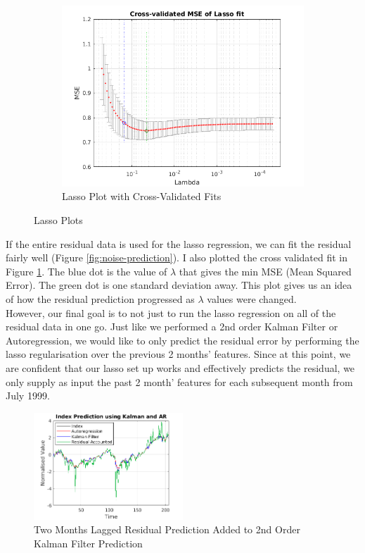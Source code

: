 \documentclass[11pt, fleqn]{article}
\begin{document}
\begin{figure}[!h]
\begin{subfigure}[b]{0.3\textwidth}
        \includegraphics[width=\textwidth]{mse-lasso.png}
	\caption{Lasso Plot with Cross-Validated Fits}
	\label{fig:mse-lasso}
    \end{subfigure}
	\caption{Lasso Plots}
	\label{fig:lasso-figs}
\end{figure}

If the entire residual data is used for the lasso regression, we can fit the residual fairly well (Figure \ref{fig:noise-prediction}). I also plotted the cross validated fit in Figure \ref{fig:mse-lasso}. The blue dot is the value of $\lambda$ that gives the min MSE (Mean Squared Error). The green dot is one standard deviation away. This plot gives us an idea of how the residual prediction progressed as $\lambda$ values were changed.\\

However, our final goal is to not just to run the lasso regression on all of the residual data in one go. Just like we performed a 2nd order Kalman Filter or Autoregression, we would like to only predict the residual error by performing the lasso regularisation over the previous 2 months' features. Since at this point, we are confident that our lasso set up works and effectively predicts the residual, we only supply as input the past 2 month' features for each subsequent month from July 1999.

\begin{figure}[!h]
    \centering
    \includegraphics[width=0.5\textwidth]{laglasso.png}
	\caption{Two Months Lagged Residual Prediction Added to 2nd Order Kalman Filter Prediction}
	\label{fig:laglasso}
\end{figure}
\end{document}
